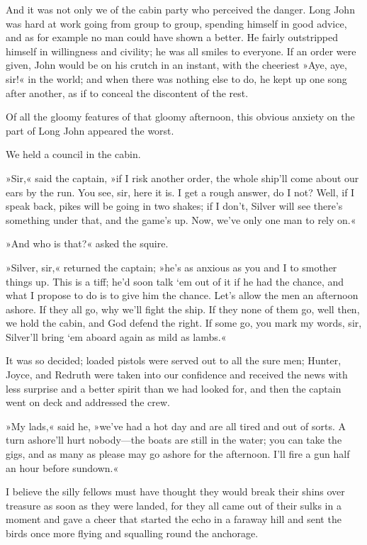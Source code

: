 And it was not only we of the cabin party who perceived the danger. Long John was hard at work going from group to group, spending himself in good advice, and as for example no man could have shown a better. He fairly outstripped himself in willingness and civility; he was all smiles to everyone. If an order were given, John would be on his crutch in an instant, with the cheeriest »Aye, aye, sir!« in the world; and when there was nothing else to do, he kept up one song after another, as if to conceal the discontent of the rest.

Of all the gloomy features of that gloomy afternoon, this obvious anxiety on the part of Long John appeared the worst.

We held a council in the cabin.

»Sir,« said the captain, »if I risk another order, the whole ship'll come about our ears by the run. You see, sir, here it is. I get a rough answer, do I not? Well, if I speak back, pikes will be going in two shakes; if I don't, Silver will see there's something under that, and the game's up. Now, we've only one man to rely on.«

»And who is that?« asked the squire.

»Silver, sir,« returned the captain; »he's as anxious as you and I to smother things up. This is a tiff; he'd soon talk `em out of it if he had the chance, and what I propose to do is to give him the chance. Let's allow the men an afternoon ashore. If they all go, why we'll fight the ship. If they none of them go, well then, we hold the cabin, and God defend the right. If some go, you mark my words, sir, Silver'll bring `em aboard again as mild as lambs.«

It was so decided; loaded pistols were served out to all the sure men; Hunter, Joyce, and Redruth were taken into our confidence and received the news with less surprise and a better spirit than we had looked for, and then the captain went on deck and addressed the crew.

»My lads,« said he, »we've had a hot day and are all tired and out of sorts. A turn ashore'll hurt nobody—the boats are still in the water; you can take the gigs, and as many as please may go ashore for the afternoon. I'll fire a gun half an hour before sundown.«

I believe the silly fellows must have thought they would break their shins over treasure as soon as they were landed, for they all came out of their sulks in a moment and gave a cheer that started the echo in a faraway hill and sent the birds once more flying and squalling round the anchorage.


